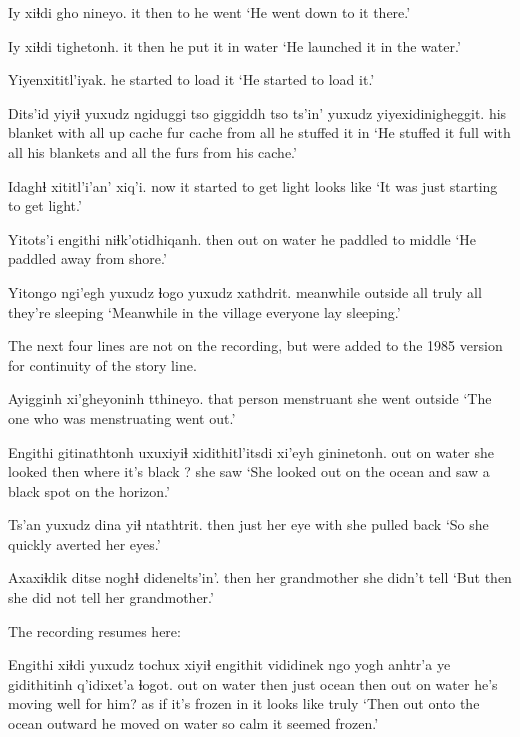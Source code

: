 \documentclass[12pt]{article}
\begin{document}
\gll Iy xiɬdi gho nineyo. 
it then  to {he went}
\glt `He went down to it there.'
\glend

\gll Iy xiɬdi tighetonh.
it  then {he put it in water} 
\glt `He launched it in the water.' 
\glend

\gll Yiyenxititl'iyak. 
{{he started to load it}}
\glt `He started to load it.' 
\glend

\gll Dits'id yiyiɬ yuxudz ngiduggi tso giggiddh tso ts'in' yuxudz yiyexidinigheggit. 
{his blanket} with all up cache fur cache from all {he stuffed it in}
\glt `He stuffed it full with all his blankets and all the furs from his cache.' 
\glend

\gll Idaghɬ xititl'i'an' xiq'i. 
now {it started to get light} {looks like} 
\glt `It was just starting to get light.'
\glend

\gll Yitots'i engithi niɬk'otidhiqanh.
then {out on water} {he paddled to middle}
\glt  `He paddled away from shore.' 
\glend

\gll Yitongo ngi'egh yuxudz ɬogo yuxudz xathdrit. 
meanwhile outside all truly all {they're sleeping}
\glt `Meanwhile in the village everyone lay sleeping.' 
\glend

The next four lines are not on the recording, but were added to the 1985 version for continuity of the story line.

\gll Ayigginh xi'gheyoninh tthineyo. 
{that person} {menstruant} {she went outside}
\glt `The one who was menstruating went out.' 
\glend

\gll Engithi gitinathtonh uxuxiyiɬ xidithitl'itsdi xi'eyh gininetonh. 
{out on water} {she looked} then {where it's black} ? {she saw}
\glt `She looked out on the ocean and saw a black spot on the horizon.' 
\glend

\gll Ts'an yuxudz dina yiɬ ntathtrit.
then just {her eye} with {she pulled back} 
\glt `So she quickly averted her eyes.' 
\glend

\gll Axaxiɬdik ditse {noghɬ didenelts'in'.}
then     {her grandmother} {she didn't tell}
\glt `But then she did not tell her grandmother.' 
\glend

The recording resumes here:

\gll Engithi xiɬdi yuxudz tochux xiyiɬ engithit vididinek ngo yogh anhtr'a {ye gidithitinh} q'idixet'a ɬogot. 
{out on water} then just ocean then {out on water} {he's moving} well {for him?} {as if} {it's frozen in} {it looks like} truly
\glt `Then out onto the ocean outward he moved on water so calm it seemed frozen.'
\glend
\end{document}
